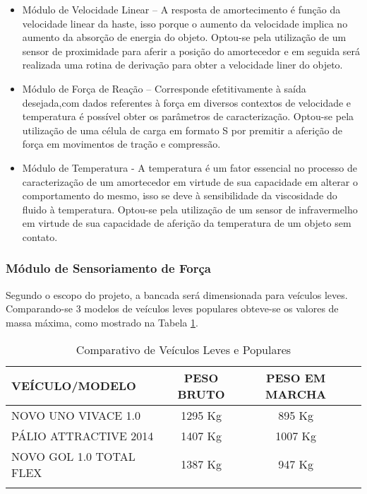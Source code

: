	\begin{itemize}

		\item Módulo de Velocidade Linear – A resposta de amortecimento é função da velocidade linear da haste, isso porque o aumento da velocidade implica no aumento da absorção de energia do objeto. Optou-se pela utilização de um sensor de proximidade para aferir a posição do amortecedor e em seguida será realizada uma rotina de derivação para obter a velocidade liner do objeto.

		\item Módulo de Força de Reação – Corresponde efetitivamente à saída desejada,com dados referentes à força em diversos contextos de velocidade e temperatura é possível obter os parâmetros de caracterização. Optou-se pela utilização de uma célula de carga em formato S por premitir a aferição de força em movimentos de tração e compressão.

		\item Módulo de Temperatura - A temperatura é um fator essencial no processo de caracterização de um amortecedor em virtude de sua capacidade em alterar o comportamento do mesmo, isso se deve à sensibilidade da viscosidade do fluido à temperatura. Optou-se pela utilização de um sensor de infravermelho em virtude de sua capacidade de aferição da temperatura de um objeto sem contato.

	\end{itemize}

	\subsubsection{Módulo de Sensoriamento de Força}

		Segundo o escopo do projeto, a bancada será dimensionada para veículos leves. Comparando-se 3 modelos de veículos leves populares obteve-se os valores de massa máxima, como mostrado na Tabela \ref{comparativocarros}.

		\begin{table}[!h]
		\centering
		\caption{Comparativo de Veículos Leves e Populares}
		\begin{tabular}{ l c c c}
		\hline
		\textbf{VEÍCULO/MODELO} & \textbf{PESO BRUTO} & \textbf{PESO EM MARCHA}\\
		\hline
		NOVO UNO VIVACE 1.0 & 1295 Kg & 895 Kg\\
		\hline
		PÁLIO ATTRACTIVE 2014 & 1407 Kg & 1007 Kg\\
		\hline
		NOVO GOL 1.0 TOTAL FLEX & 1387 Kg & 947 Kg\\
		\hline
		\label{comparativocarros}
		\end{tabular}
		\end{table}

